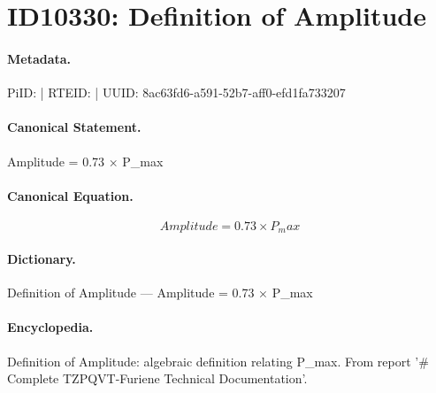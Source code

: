 \section*{ID10330: Definition of Amplitude}
\paragraph{Metadata.}
PiID:  | RTEID:  | UUID: 8ac63fd6-a591-52b7-aff0-efd1fa733207

\paragraph{Canonical Statement.}
Amplitude = 0.73 × P\_max

\paragraph{Canonical Equation.}
\[
Amplitude = 0.73 × P_max
\]

\paragraph{Dictionary.}
Definition of Amplitude — Amplitude = 0.73 × P\_max

\paragraph{Encyclopedia.}
Definition of Amplitude: algebraic definition relating P\_max. From report '\# Complete TZPQVT-Furiene Technical Documentation'.
